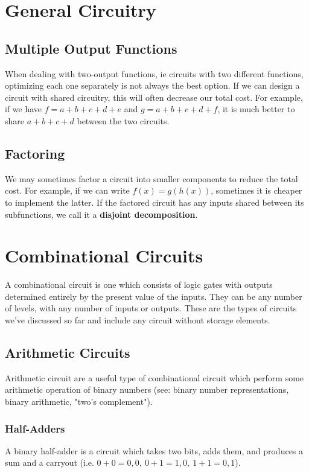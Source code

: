 \documentclass[12pt]{article}
\begin{document}
\section*{General Circuitry}
\subsection*{Multiple Output Functions}
When dealing with two-output functions, ie circuits with two different functions, optimizing each one separately is not always the best option. If we can design a circuit with shared circuitry, this will often decrease our total cost. For example, if we have $f = a + b + c + d + e$ and $g = a + b + c + d + f$, it is much better to share $a + b + c + d$ between the two circuits.

\subsection*{Factoring}
We may sometimes factor a circuit into smaller components to reduce the total cost. For example, if we can write $f(x) = g(h(x))$, sometimes it is cheaper to implement the latter. If the factored circuit has any inputs shared between its subfunctions, we call it a {\bf disjoint decomposition}.

\section*{Combinational Circuits}
A combinational circuit is one which consists of logic gates with outputs determined entirely by the present value of the inputs. They can be any number of levels, with any number of inputs or outputs. These are the types of circuits we've discussed so far and include any circuit without storage elements.

\subsection*{Arithmetic Circuits}
Arithmetic circuit are a useful type of combinational circuit which perform some arithmetic operation of binary numbers (see: binary number representations, binary arithmetic, "two's complement").

\subsubsection*{Half-Adders}
A binary half-adder is a circuit which takes two bits, adds them, and produces a sum and a carryout (i.e. $0 + 0 = 0,0,\ 0 + 1 = 1,0,\ 1 + 1 = 0,1$).
\end{document}
